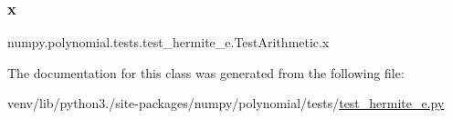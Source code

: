 \subsubsection{\texorpdfstring{x}{x}}
{\footnotesize\ttfamily numpy.\+polynomial.\+tests.\+test\+\_\+hermite\+\_\+e.\+Test\+Arithmetic.\+x\hspace{0.3cm}{\ttfamily [static]}}



The documentation for this class was generated from the following file\+:\begin{DoxyCompactItemize}
\item 
venv/lib/python3./site-\/packages/numpy/polynomial/tests/\hyperlink{test__hermite__e_8py}{test\+\_\+hermite\+\_\+e.\+py}\end{DoxyCompactItemize}
